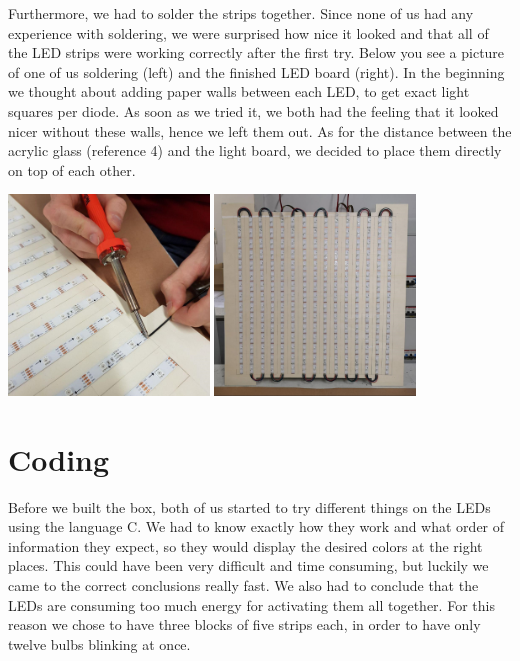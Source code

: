 \documentclass[a4paper,12pt]{article}
\begin{document}
Furthermore, we had to solder the strips together.
 Since none of us had any experience with soldering, we were surprised how nice it looked and that all of the LED strips were working correctly after the first try.
 Below you see a picture of one of us soldering (left) and the finished LED board (right).
 In the beginning we thought about adding paper walls between each LED, to get exact light squares per diode.
 As soon as we tried it, we both had the feeling that it looked nicer without these walls, hence we left them out.
 As for the distance between the acrylic glass (reference 4) and the light board, we decided to place them directly on top of each other.
 
 \vspace{1cm}

{ \centering
  \includegraphics[width = 0.4\textwidth]{loten.jpg}
  \space{   }
  \includegraphics[width = 0.4\textwidth]{matrix.jpg}
  \\}
 \vspace{1cm}
 
\section{Coding}
Before we built the box, both of us started to try different things on the LEDs using the language C.
 We had to know exactly how they work and what order of information they expect, so they would display the desired colors at the right places.
 This could have been very difficult and time consuming, but luckily we came to the correct conclusions really fast.
 We also had to conclude that the LEDs are consuming too much energy for activating them all together.
 For this reason we chose to have three blocks of five strips each, in order to have only twelve bulbs blinking at once.
 
\end{document}
